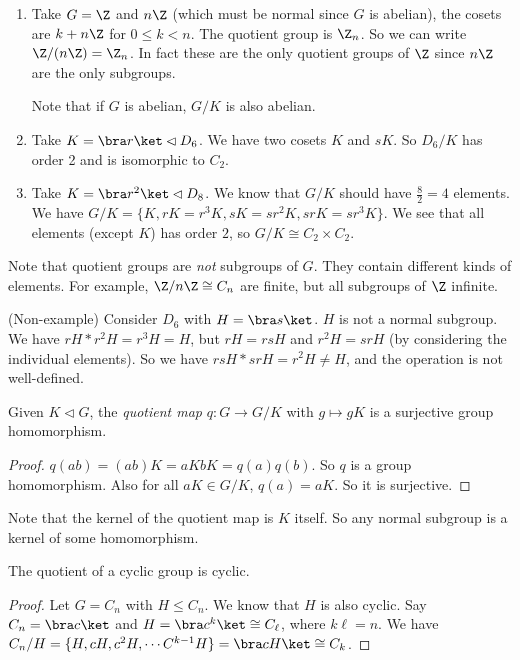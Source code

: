 \documentclass[a4paper]{article}
\begin{document}
\begin{eg}\leavevmode
  \begin{enumerate}
    \item Take $G = \Z$ and $n\Z$ (which must be normal since $G$ is abelian), the cosets are $k + n\Z$ for $0 \leq k < n$. The quotient group is $\Z_n$. So we can write $\Z/(n\Z) = \Z_n$. In fact these are the only quotient groups of $\Z$ since $n\Z$ are the only subgroups.

      Note that if $G$ is abelian, $G/K$ is also abelian.
    \item Take $K = \bra r\ket \lhd D_6$. We have two cosets $K$ and $sK$. So $D_6/K$ has order 2 and is isomorphic to $C_2$.
    \item Take $K = \bra r^2\ket \lhd D_8$. We know that $G/K$ should have $\frac{8}{2} = 4$ elements. We have $G/K = \{ K, rK = r^3 K, sK = sr^2K, srK = sr^3K\}$. We see that all elements (except $K$) has order $2$, so $G/K\cong C_2\times C_2$.
  \end{enumerate}
\end{eg}
Note that quotient groups are \emph{not} subgroups of $G$. They contain different kinds of elements. For example, $\Z/n\Z \cong C_n$ are finite, but all subgroups of $\Z$ infinite.


\begin{eg}
  (Non-example) Consider $D_6$ with $H = \bra s\ket$. $H$ is not a normal subgroup. We have $rH * r^2 H = r^3 H = H$, but $rH = rsH$ and $r^2H = srH$ (by considering the individual elements). So we have $rsH * srH = r^2 H\not= H$, and the operation is not well-defined.
\end{eg}

\begin{lemma}
  Given $K\lhd G$, the \emph{quotient map} $q: G\rightarrow G/K$ with $g\mapsto gK$ is a surjective group homomorphism.
\end{lemma}

\begin{proof}
  $q(ab) = (ab)K = aKbK = q(a)q(b)$. So $q$ is a group homomorphism. Also for all $aK \in G/K$, $q(a) = aK$. So it is surjective.
\end{proof}
Note that the kernel of the quotient map is $K$ itself. So any normal subgroup is a kernel of some homomorphism.

\begin{prop}
  The quotient of a cyclic group is cyclic.
\end{prop}

\begin{proof}
  Let $G = C_n$ with $H\leq C_n$. We know that $H$ is also cyclic. Say $C_n = \bra c\ket$ and $H = \bra c^k \ket \cong C_\ell$, where $k\ell = n$. We have $C_n/H = \{H, cH, c^2H, \cdots C^{k - 1}H\}=\bra cH\ket \cong C_k$.
\end{proof}
\end{document}
